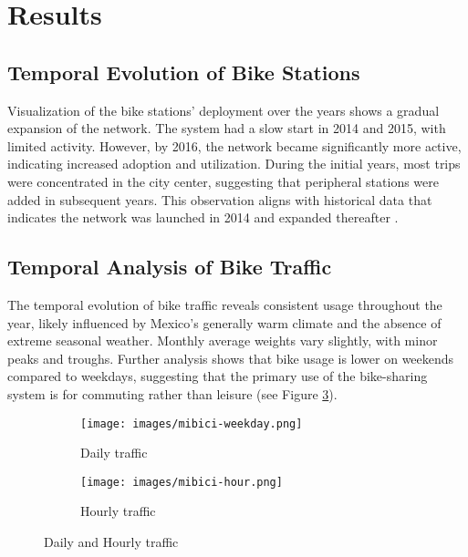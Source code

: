\documentclass[conference]{IEEEtran}
\begin{document}
\section{Results}

\subsection{Temporal Evolution of Bike Stations}
Visualization of the bike stations' deployment over the years shows a gradual expansion of the network. The system had a slow start in 2014 and 2015, with limited activity. However, by 2016, the network became significantly more active, indicating increased adoption and utilization. During the initial years, most trips were concentrated in the city center, suggesting that peripheral stations were added in subsequent years. This observation aligns with historical data that indicates the network was launched in 2014 and expanded thereafter \cite{itdp2014}.

\subsection{Temporal Analysis of Bike Traffic}
The temporal evolution of bike traffic reveals consistent usage throughout the year, likely influenced by Mexico's generally warm climate and the absence of extreme seasonal weather. Monthly average weights vary slightly, with minor peaks and troughs. Further analysis shows that bike usage is lower on weekends compared to weekdays, suggesting that the primary use of the bike-sharing system is for commuting rather than leisure (see Figure \ref{fig:mibici-temporal-analysis}).

\begin{figure}[htbp]
    \centering
    \begin{subfigure}[b]{0.20\textwidth}
        \centering
        \texttt{[image: images/mibici-weekday.png]}
        \caption{Daily traffic}
        \label{fig:mibici-daily}
    \end{subfigure}
    \hfill
    \begin{subfigure}[b]{0.20\textwidth}
        \centering
        \texttt{[image: images/mibici-hour.png]}
        \caption{Hourly traffic}
        \label{fig:mibici-hourly}
    \end{subfigure}
    \caption{Daily and Hourly traffic}
    \label{fig:mibici-temporal-analysis}
\end{figure}
\end{document}
